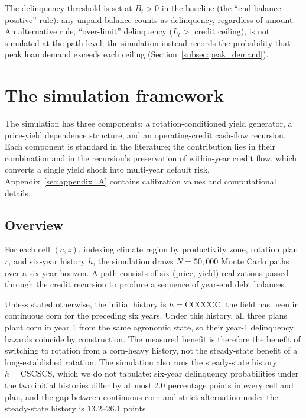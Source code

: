 \documentclass[11pt,letterpaper]{article}
\theoremstyle{remark}
\begin{document}
The delinquency threshold is set at $B_t > 0$ in the baseline (the ``end-balance-positive'' rule): any unpaid balance counts as delinquency, regardless of amount. An alternative rule, ``over-limit'' delinquency ($L_t > $ credit ceiling), is not simulated at the path level; the simulation instead records the probability that peak loan demand exceeds each ceiling (Section~\ref{subsec:peak_demand}).
 
\section{\label{sec:simulation}The simulation framework}
 
The simulation has three components: a rotation-conditioned yield generator, a price-yield dependence structure, and an operating-credit cash-flow recursion. Each component is standard in the literature; the contribution lies in their combination and in the recursion's preservation of within-year credit flow, which converts a single yield shock into multi-year default risk. Appendix~\ref{sec:appendix_A} contains calibration values and computational details.
 
\subsection{\label{subsec:overview}Overview}
 
For each cell $(c,z)$, indexing climate region by productivity zone, rotation plan $r$, and six-year history $h$, the simulation draws $N = 50{,}000$ Monte Carlo paths over a six-year horizon. A path consists of six (price, yield) realizations passed through the credit recursion to produce a sequence of year-end debt balances.

Unless stated otherwise, the initial history is $h = \text{CCCCCC}$: the field has been in continuous corn for the preceding six years. Under this history, all three plans plant corn in year 1 from the same agronomic state, so their year-1 delinquency hazards coincide by construction. The measured benefit is therefore the benefit of switching to rotation from a corn-heavy history, not the steady-state benefit of a long-established rotation. The simulation also runs the steady-state history $h = \text{CSCSCS}$, which we do not tabulate: six-year delinquency probabilities under the two initial histories differ by at most 2.0 percentage points in every cell and plan, and the gap between continuous corn and strict alternation under the steady-state history is 13.2--26.1 points.
\end{document}
